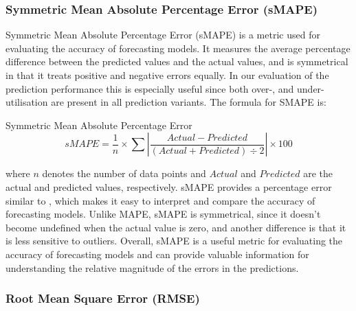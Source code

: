     \subsubsection{Symmetric Mean Absolute Percentage Error (sMAPE)}
    \label{sec:smape-metrics-evaluation}
    
      Symmetric Mean Absolute Percentage Error (sMAPE) \cite{kreinovichHowEstimateForecasting2014} is a metric used for evaluating the accuracy of forecasting models. It measures the average percentage difference between the predicted values and the actual values, and is symmetrical in that it treats positive and negative errors equally.
      In our evaluation of the prediction performance this is especially useful since both over-, and under-utilisation are present in all prediction variants.
      The formula for SMAPE is:

      \begin{pabox}{Symmetric Mean Absolute Percentage Error}
        $$sMAPE = \frac{1}{n} \times \sum \left|\frac{Actual - Predicted}{\left(Actual + Predicted\right) \div 2}\right| \times 100$$
      \end{pabox}
      where $n$ denotes the number of data points and $Actual$ and $Predicted$ are the actual and predicted values, respectively.
      sMAPE provides a percentage error similar to , which makes it easy to interpret and compare the accuracy of forecasting models. Unlike MAPE, sMAPE is symmetrical, since it doesn't become undefined when the actual value is zero, and another difference is that it is less sensitive to outliers.
      Overall, sMAPE is a useful metric for evaluating the accuracy of forecasting models and can provide valuable information for understanding the relative magnitude of the errors in the predictions.

    \subsubsection{Root Mean Square Error (RMSE)}
    \label{sec:rmse-metrics-evaluation}

